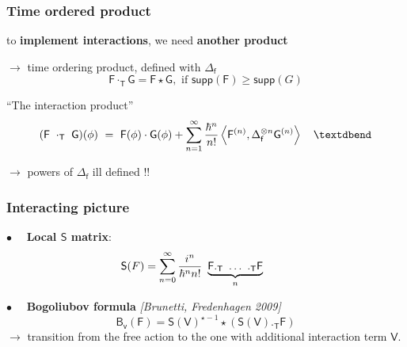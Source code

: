 \documentclass[9pt]{beamer}
\newcommand{\Tdot}{\cdot_\Tsf} %
\newcommand{\Smearip}[1]{\left\langle #1 \right\rangle} %
\newcommand{\supp}{\mathsf{supp}} %
\newcommand{\citebeam}[1]{\textit{\textcolor{black!60!white}{[#1]}}} %
\newcommand{\Bsf}{\mathsf{B}}
\newcommand{\Fsf}{\mathsf{F}}
\newcommand{\Gsf}{\mathsf{G}}
\newcommand{\Ssf}{\mathsf{S}}
\newcommand{\Tsf}{\mathsf{T}}
\newcommand{\Vsf}{\mathsf{V}}
\newcommand{\fsf}{\mathsf{f}}
\newcommand{\vsf}{\mathsf{v}}
\begin{document}
\begin{frame}

\frametitle{Time ordered product}

\vfill

to \textbf{implement interactions}, we need \textbf{another product} 

\vfill

\hspace*{8pt} $\to$ time ordering product, defined with $\Delta_\fsf$ 
\vspace*{-8pt}
\begin{equation*}
\Fsf \Tdot \Gsf = \Fsf \star \Gsf, \mbox{ if } \supp(\Fsf) \geq \supp(G)
\end{equation*}

\vfill

\begin{block}{``The interaction product''}
\vspace*{-13pt}
\begin{equation*}
(\Fsf \ \Tdot \ \Gsf)(\phi) \ = \ \Fsf(\phi) \cdot \Gsf(\phi) + \sum_{n=1}^{\infty} \frac{\hbar^n}{n!} \Smearip{\Fsf^{(n)},\Delta_{\fsf}^{\otimes n} \Gsf^{(n)}} \quad \textdbend  
\vspace*{-6pt}
\end{equation*}
\end{block}

\vfill

\hspace*{8pt} $\to$ powers of $\Delta_\fsf$ ill defined !!  

\vfill

\end{frame}  


\begin{frame}

\frametitle{Interacting picture}

\vfill

$\bullet \quad$ \textbf{Local $\Ssf$ matrix}:
\vspace*{-17pt}
\begin{equation*}
 \hspace*{-25pt} \Ssf(F) = \sum_{n=0}^{\infty} \frac{i^n}{\hbar^n n!} \ \underbrace{\Fsf ._\Tsf \ \dots \ ._\Tsf \Fsf}_{n}
\end{equation*}

\vfill

$\bullet \quad$ \textbf{Bogoliubov formula} \citebeam{Brunetti, Fredenhagen 2009} \\[-10pt]
\begin{equation*}
 \Bsf_\vsf(\Fsf) = \Ssf(\Vsf)^{\star -1} \star \left( \Ssf(\Vsf) ._{\Tsf} \Fsf \right) 
\end{equation*}
$\to$  transition from the free action to the one with additional interaction term $\Vsf$.

\vfill

\end{frame}  
\end{document}
